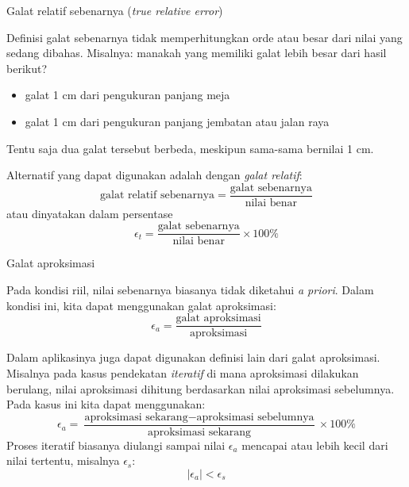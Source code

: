 \begin{frame}{Galat relatif sebenarnya (\textit{true relative error})}

Definisi galat sebenarnya tidak memperhitungkan orde atau besar
dari nilai yang sedang dibahas. Misalnya: manakah yang memiliki galat lebih
besar dari hasil berikut?
\begin{itemize}\tightlist
\item galat 1 cm dari pengukuran panjang meja
\item galat 1 cm dari pengukuran panjang jembatan atau jalan raya
\end{itemize}
Tentu saja dua galat tersebut berbeda, meskipun sama-sama bernilai
1 cm.

Alternatif yang dapat digunakan
adalah dengan \textit{galat relatif}:
\begin{equation*}
\text{galat relatif sebenarnya} = \frac{\text{galat sebenarnya}}{\text{nilai benar}}
\end{equation*}
atau dinyatakan dalam persentase
\begin{equation*}
\epsilon_{t} = \frac{\text{galat sebenarnya}}{\text{nilai benar}} \times 100\%
\end{equation*}

\end{frame}



\begin{frame}{Galat aproksimasi}

Pada kondisi riil, nilai sebenarnya biasanya tidak diketahui \textit{a priori}.
Dalam kondisi ini, kita dapat menggunakan galat aproksimasi:
\begin{equation*}
\epsilon_{a} = \frac{\text{galat aproksimasi}}{\text{aproksimasi}}
\end{equation*}

Dalam aplikasinya juga dapat digunakan definisi lain dari galat aproksimasi.
Misalnya pada kasus pendekatan \textit{iteratif} di mana aproksimasi dilakukan
berulang, nilai aproksimasi dihitung berdasarkan nilai aproksimasi sebelumnya.
Pada kasus ini kita dapat menggunakan:
\begin{equation*}
\epsilon_{a} = \frac{\text{aproksimasi sekarang} - \text{aproksimasi sebelumnya}}%
{\text{aproksimasi sekarang}} \times 100\%
\end{equation*}
Proses iteratif biasanya diulangi sampai nilai $\epsilon_{a}$ mencapai atau
lebih kecil dari nilai tertentu, misalnya $\epsilon_{s}$:
\begin{equation*}
\left| \epsilon_{a} \right| < \epsilon_{s}
\end{equation*}


\end{frame}


